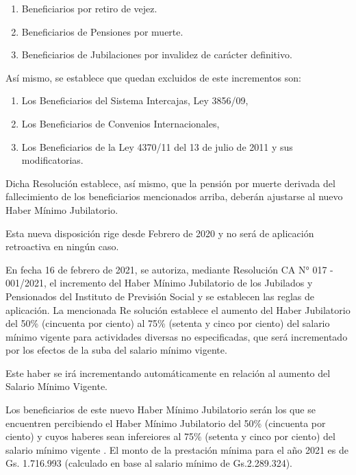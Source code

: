 \begin{enumerate}[label=\alph*.]

\item Beneficiarios por retiro de vejez.

\item Beneficiarios de Pensiones por muerte.

\item Beneficiarios de Jubilaciones por invalidez de carácter definitivo.

\end{enumerate}

Así mismo, se establece que quedan excluidos de este incrementos son:

\begin{enumerate}[label=\alph*.]

\item Los Beneficiarios del Sistema Intercajas, Ley 3856/09, 

\item Los Beneficiarios de Convenios Internacionales,

\item Los Beneficiarios de la Ley 4370/11 del 13 de julio de 2011 y sus modificatorias. 

\end{enumerate}

Dicha Resolución establece, así mismo, que la pensión por muerte
derivada del fallecimiento de los beneficiarios mencionados arriba,
deberán ajustarse al nuevo Haber Mínimo Jubilatorio.

Esta nueva disposición rige desde Febrero de 2020 y no será de
aplicación retroactiva en ningún caso.

En fecha 16 de febrero de 2021, se autoriza, mediante Resolución CA N°
017 - 001/2021, el incremento del Haber Mínimo Jubilatorio de los
Jubilados y Pensionados del Instituto de Previsión Social y se
establecen las reglas de aplicación. La mencionada Re solución establece
el aumento del Haber Jubilatorio del 50\% (cincuenta por ciento) al 75\%
(setenta y cinco por ciento) del salario mínimo vigente para actividades
diversas no especificadas, que será incrementado por los efectos de la
suba del salario mínimo vigente\cite{IPS. (2021)}.

Este haber se irá incrementando automáticamente en relación al aumento
del Salario Mínimo Vigente.

Los beneficiarios de este nuevo Haber Mínimo Jubilatorio serán los que
se encuentren percibiendo el Haber Mínimo Jubilatorio del 50\%
(cincuenta por ciento) y cuyos haberes sean infereiores al 75\% (setenta
y cinco por ciento) del salario mínimo vigente . El monto de la
prestación mínima para el año 2021 es de Gs. 1.716.993 (calculado en
base al salario mínimo de Gs.2.289.324).

